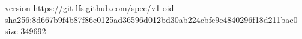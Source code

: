 version https://git-lfs.github.com/spec/v1
oid sha256:8d667b9f4b87f86e0125ad36596d012bd30ab224cbfe9e4840296f18d211bac0
size 349692
